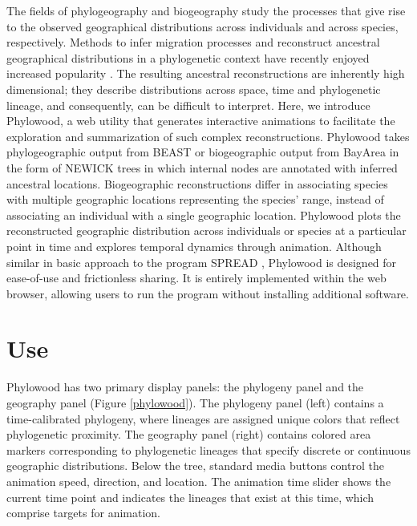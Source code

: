 \documentclass{bioinfo}
\begin{document}
The fields of phylogeography and biogeography study the processes that give rise to the observed geographical distributions across individuals and across species, respectively. Methods to infer migration processes and reconstruct ancestral geographical distributions in a phylogenetic context have recently enjoyed increased popularity \citep{ree08, lemey09, yu10, landis12}. The resulting ancestral reconstructions are inherently high dimensional; they describe distributions across space, time and phylogenetic lineage, and consequently, can be difficult to interpret. Here, we introduce Phylowood, a web utility that generates interactive animations to facilitate the exploration and summarization of such complex reconstructions.
Phylowood takes phylogeographic output from BEAST \citep{drummond12} or biogeographic output from BayArea \citep{landis12} in the form of NEWICK trees in which internal nodes are annotated with inferred ancestral locations. Biogeographic reconstructions differ in associating species with multiple geographic locations representing the species' range, instead of associating an individual with a single geographic location. Phylowood plots the reconstructed geographic distribution across individuals or species at a particular point in time and explores temporal dynamics through animation.
Although similar in basic approach to the program SPREAD \cite{bielejec11}, Phylowood is designed for ease-of-use and frictionless sharing.
It is entirely implemented within the web browser, allowing users to run the program without installing additional software.

\section{Use}

Phylowood has two primary display panels: the phylogeny panel and the geography panel (Figure \ref{phylowood}). The phylogeny panel (left) contains a time-calibrated phylogeny, where lineages are assigned unique colors that reflect phylogenetic proximity. The geography panel (right) contains colored area markers corresponding to phylogenetic lineages that specify discrete or continuous geographic distributions. Below the tree, standard media buttons control the animation speed, direction, and location. The animation time slider shows the current time point and indicates the lineages that exist at this time, which comprise targets for animation.
\end{document}
